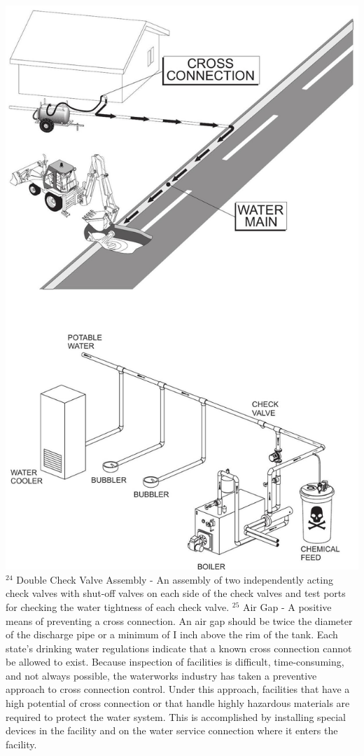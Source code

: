 \documentclass[10pt]{article}
\begin{document}
\begin{itemize}
\includegraphics[max width=\textwidth]{2022_11_03_fc0cbc2f3612fab6edd2g-41}${ }^{24}$ Double Check Valve Assembly - An assembly of two independently acting check valves with shut-off valves on each side of the check valves and test ports for checking the water tightness of each check valve. ${ }^{25}$ Air Gap - A positive means of preventing a cross connection. An air gap should be twice the diameter of the discharge pipe or a minimum of $\mathrm{I}$ inch above the rim of the tank. Each state's drinking water regulations indicate that a known cross connection cannot be allowed to exist. Because inspection of facilities is difficult, time-consuming, and not always possible, the waterworks industry has taken a preventive approach to cross connection control. Under this approach, facilities that have a high potential of cross connection or that handle highly hazardous materials are required to protect the water system. This is accomplished by installing special devices in the facility and on the water service connection where it enters the facility.
\end{itemize}
\end{document}
